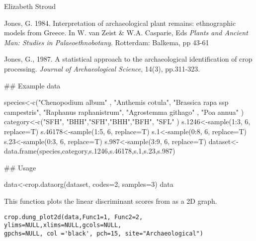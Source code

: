 \documentclass[a4paper]{book}
\begin{document}
%
\begin{Author}\relax
Elizabeth Stroud
\end{Author}
%
\begin{References}\relax
Jones, G. 1984. Interpretation of archaeological plant remains: ethnographic models from Greece. In W. van Zeist \& W.A. Casparie, Eds \emph{Plants and Ancient Man: Studies in Palaeoethnobotany}. Rotterdam: Balkema, pp 43-61

Jones, G., 1987. A statistical approach to the archaeological identification of crop processing. \emph{Journal of Archaeological Science}, 14(3), pp.311-323.
\end{References}
%
\begin{Examples}
\begin{ExampleCode}
## Example data

species<-c("Chenopodium album" , "Anthemis cotula", "Brassica rapa ssp campestris",
"Raphanus raphanistrum", "Agrostemma githago" , "Poa annua" )
category<-c("SFH", "BHH","SFH","BHH","BFH", "SFL" )
s.1246<-sample(1:3, 6, replace=T)
s.46178<-sample(1:5, 6, replace=T)
s.1<-sample(0:8, 6, replace=T)
s.23<-sample(0:3, 6, replace=T)
s.987<-sample(3:9, 6, replace=T)
dataset<-data.frame(species,category,s.1246,s.46178,s.1,s.23,s.987)

## Usage

data<-crop.dataorg(dataset, codes=2, samples=3)
data
\end{ExampleCode}
\end{Examples}
%
\begin{Description}\relax
This function plots the  linear discriminant scores from  as a 2D graph.
\end{Description}
%
\begin{Usage}
\begin{verbatim}
crop.dung_plot2d(data,Func1=1, Func2=2, ylims=NULL,xlims=NULL,gcols=NULL,
gpchs=NULL, col ='black', pch=15, site="Archaeological")
\end{verbatim}
\end{Usage}
%
\end{document}
